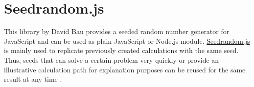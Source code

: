\section{Seedrandom.js}
\label{sec:tecSeed}
This library by David Bau provides a seeded random number generator for JavaScript and can be used as plain JavaScript or Node.js module. \href{https://github.com/davidbau/seedrandom}{Seedrandom.js} is mainly used to replicate previously created calculations with the same seed. Thus, seeds that can solve a certain problem very quickly or provide an illustrative calculation path for explanation purposes can be reused for the same result at any time \cite{Bau2019}. 

